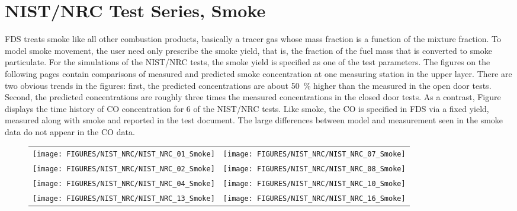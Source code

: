 \clearpage


\section{NIST/NRC Test Series, Smoke}

FDS treats smoke like all other combustion products, basically a tracer gas whose mass fraction is a function of the mixture fraction.
To model smoke movement, the user need only prescribe the smoke yield, that is, the fraction of the fuel mass that is
converted to smoke particulate.  For the simulations of the NIST/NRC tests, the smoke yield is specified as one of the test parameters.
The figures on the following pages contain comparisons of measured and predicted smoke concentration at one measuring station in the upper layer.
There are two obvious trends in the figures: first, the predicted concentrations are about 50~\% higher than the measured
in the open door tests.  Second,
the predicted concentrations are roughly three times the measured concentrations in the closed door tests.
As a contrast, Figure displays the time history of CO concentration for 6 of the NIST/NRC tests.
Like smoke, the CO is specified in FDS via a fixed yield, measured along with smoke and reported in the test document.
The large differences between model and measurement seen in the smoke data do not appear in the CO data.

\newpage

\begin{figure}[p]
\begin{tabular*}{\textwidth}{l@{\extracolsep{\fill}}r}
\texttt{[image: FIGURES/NIST\_NRC/NIST\_NRC\_01\_Smoke]} &
\texttt{[image: FIGURES/NIST\_NRC/NIST\_NRC\_07\_Smoke]} \\
\texttt{[image: FIGURES/NIST\_NRC/NIST\_NRC\_02\_Smoke]} &
\texttt{[image: FIGURES/NIST\_NRC/NIST\_NRC\_08\_Smoke]} \\
\texttt{[image: FIGURES/NIST\_NRC/NIST\_NRC\_04\_Smoke]} &
\texttt{[image: FIGURES/NIST\_NRC/NIST\_NRC\_10\_Smoke]} \\
\texttt{[image: FIGURES/NIST\_NRC/NIST\_NRC\_13\_Smoke]} &
\texttt{[image: FIGURES/NIST\_NRC/NIST\_NRC\_16\_Smoke]}
\end{tabular*}
\end{figure}

